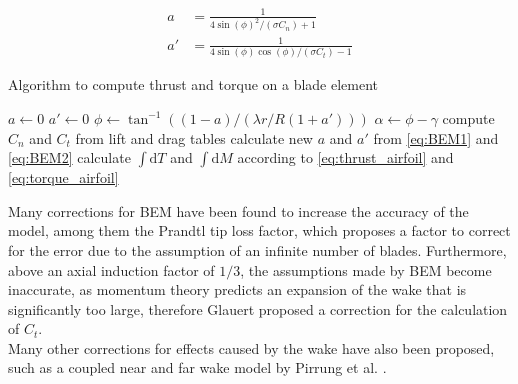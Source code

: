 \begin{align}
	a &= \frac{1}{4 \sin(\phi)^2 / \left(\sigma C_n \right) +1} \label{eq:BEM1} \\
	a' &= \frac{1}{4 \sin(\phi) \cos(\phi) / \left( \sigma C_t \right) -1} \label{eq:BEM2}
\end{align}
\begin{algorithm}
	\caption{Algorithm to compute thrust and torque on a blade element}
	\label{al:BEM}
	\begin{algorithmic}
			\STATE $a \gets 0$ 
			\STATE $a'\gets 0$
			\REPEAT
				\STATE $\phi \gets \tan^{-1}((1-a)/(\lambda r/R (1+a') ))$
				\STATE $\alpha \gets \phi - \gamma$
				\STATE compute $C_n$ and $C_t$ from lift and drag tables
				\STATE calculate new $a$ and $a'$ from \eqref{eq:BEM1} and \eqref{eq:BEM2}
		\ENDFOR
		\STATE calculate $\int \mathrm{d}T$ and $\int \mathrm{d}M$ according to \eqref{eq:thrust_airfoil} and \eqref{eq:torque_airfoil}
	\end{algorithmic}
\end{algorithm}
Many corrections for BEM have been found to increase the accuracy of the model, among them the Prandtl tip loss factor, which proposes a factor to correct for the error due to the assumption of an infinite number of blades. Furthermore, above an axial induction factor of $1/3$, the assumptions made by BEM become inaccurate, as momentum theory predicts an expansion of the wake that is significantly too large, therefore Glauert proposed a correction for the calculation of $C_t$. \cite[p. 103 - 104]{sorensen_general_2016} \\
Many other corrections for effects caused by the wake have also been proposed, such as a coupled near and far wake model by Pirrung et al. \cite{pirrung_coupled_2016}.
